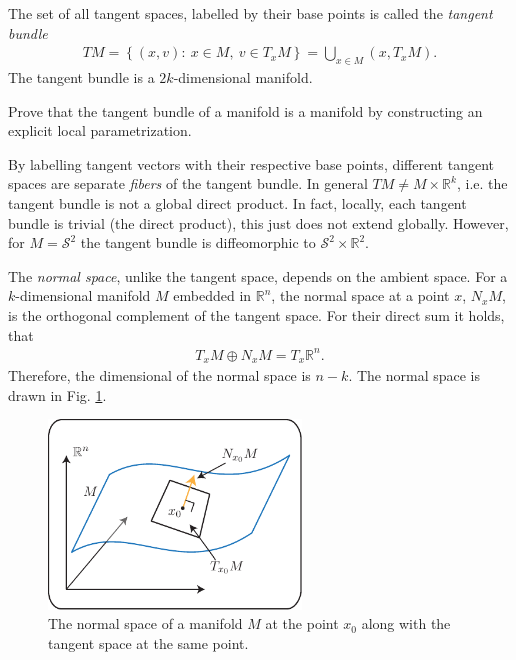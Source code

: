 \begin{definition}
	The set of all tangent spaces, labelled by their base points is called the \emph{tangent bundle}
	\begin{align}
		\boxed{
			TM = \left\{ (x,v):\ x\in M,\ v\in T_{x}M \right\} = \bigcup_{x\in M}(x, T_{x}M).
		}
	\end{align}
The tangent bundle is a $2k$-dimensional manifold.	
\end{definition}

\begin{exercise}
Prove that the tangent bundle of a manifold is a manifold by constructing an explicit local parametrization.
\end{exercise}

By labelling tangent vectors with their respective base points, different tangent spaces are separate \emph{fibers} of the tangent bundle. In general $TM \neq M \times \mathbb{R}^{k}$, i.e. the tangent bundle is not a global direct product. In fact, locally, each tangent bundle is trivial (the direct product), this just does not extend globally. However, for $M=\mathcal{S}^{2}$ the tangent bundle is diffeomorphic to $\mathcal{S}^{2} \times \mathbb{R}^{2}$. 

\begin{definition}
	The \emph{normal space}, unlike the tangent space, depends on the ambient space. For a $k$-dimensional manifold $M$ embedded in $\mathbb{R}^{n}$, the normal space at a point $x$, $N_{x}M$, is the orthogonal complement of the tangent space. For their direct sum it holds, that 
	\begin{align}
		\boxed{
			T_{x}M \oplus N_{x}M = T_{x}\mathbb{R}^{n}.
		}
	\end{align}
	Therefore, the dimensional of the normal space is $n-k$. The normal space is drawn in Fig. \ref{fig:normal_space_def}.	
	\begin{figure}[h!]
		\centering
		\includegraphics[width=0.6\textwidth]{figures/ch9/8normal_space_def.pdf}
		\caption{The normal space of a manifold $M$ at the point $x_0$ along with the tangent space at the same point.}
		\label{fig:normal_space_def}
	\end{figure}
\end{definition}

